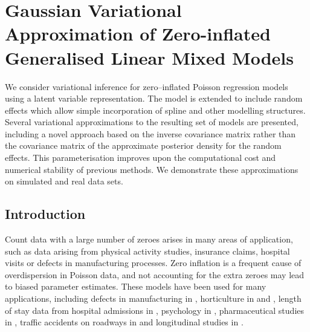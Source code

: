 \chapter{Gaussian Variational Approximation of Zero-inflated Generalised
         Linear Mixed Models}


\noindent We consider variational inference for zero--inflated Poisson
    regression models using a latent variable representation. The model is
    extended to include random effects which allow simple incorporation of
    spline and other modelling structures. Several variational approximations
    to the resulting set of models are presented, including a novel approach
    based on the inverse covariance matrix rather than the covariance matrix of
    the approximate posterior density for the random effects. This
    parameterisation improves upon the computational cost and numerical
    stability of previous methods. We demonstrate these approximations on
    simulated and real data sets.


\newpage
 


\section{Introduction}
\label{sec:introduction}

Count data with a large number of zeroes arises in many areas of application,
such as data arising from physical activity studies, insurance claims, hospital
visits or defects in manufacturing processes. Zero inflation is a frequent
cause of overdispersion in Poisson data, and not accounting for the extra
zeroes may lead to biased parameter estimates. These models have been used for
many applications, including defects in manufacturing in \cite{lambert1992},
horticulture in \cite{BIOM:BIOM1030} and \cite{BIOM:BIOM1030}, length of stay
data from hospital admissions in \cite{BIMJ:BIMJ200390024}, psychology in
\cite{JOFP:rethink}, pharmaceutical studies in \cite{Min01042005}, traffic
accidents on roadways in \cite{Shankar1997829} and longitudinal studies in
\cite{LeeWangScottYauMcLachlan2006}.

